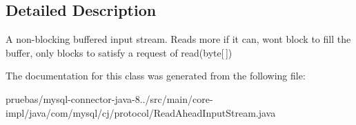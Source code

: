 \subsection{Detailed Description}
A non-\/blocking buffered input stream. Reads more if it can, won\textquotesingle{}t block to fill the buffer, only blocks to satisfy a request of read(byte\mbox{[}$\,$\mbox{]}) 

The documentation for this class was generated from the following file\+:\begin{DoxyCompactItemize}
\item 
pruebas/mysql-\/connector-\/java-\/8../src/main/core-\/impl/java/com/mysql/cj/protocol/Read\+Ahead\+Input\+Stream.\+java\end{DoxyCompactItemize}

